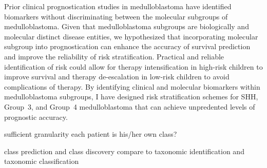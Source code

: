 Prior clinical prognostication studies in medulloblastoma have identified biomarkers without discriminating between the molecular subgroups of medulloblastoma. Given that medulloblastoma subgroups are biologically and molecular distinct disease entities, we hypothesized that incorporating molecular subgroup into prognostication can enhance the accuracy of survival prediction and improve the reliability of risk stratification. Practical and reliable identification of risk could allow for therapy intensification in high-risk children to improve survival and therapy de-escalation in low-risk children to avoid complications of therapy. By identifying clinical and molecular biomarkers within medulloblastoma subgroups, I have designed risk stratification schemes for SHH, Group~3, and Group~4 medulloblastoma that can achieve unpredented levels of prognostic accuracy.


sufficient granularity
each patient is his/her own class?

class prediction and class discovery
compare to taxonomic identification and taxonomic classification

